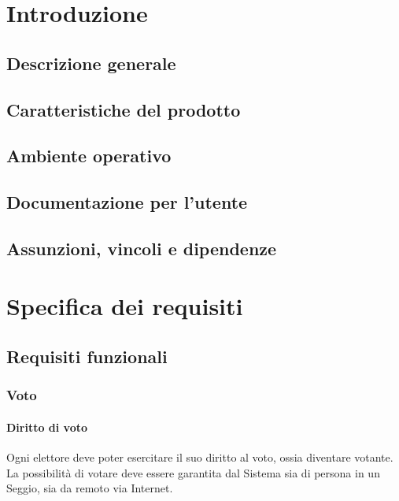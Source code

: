 \documentclass{report}
\begin{document}
\chapter{Introduzione}
\section{Descrizione generale}
\section{Caratteristiche del prodotto}
\section{Ambiente operativo}
\section{Documentazione per l'utente}
\section{Assunzioni, vincoli e dipendenze}




\chapter{Specifica dei requisiti}


\section{Requisiti funzionali}

\subsection{Voto}

\subsubsection{Diritto di voto}
Ogni elettore deve poter esercitare il suo diritto al voto, ossia diventare votante. La possibilità di votare deve essere garantita dal Sistema sia di persona in un Seggio, sia da remoto via Internet.
\end{document}
